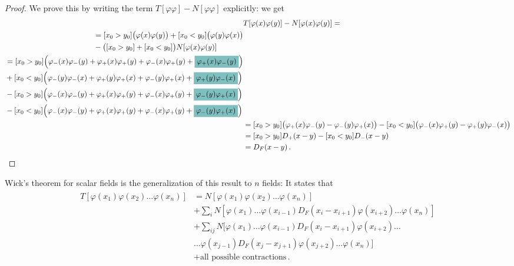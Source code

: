 \documentclass[main.tex]{subfiles}
\begin{document}
\begin{proof}
We prove this by writing the term \(T[\varphi \varphi ] - N[ \varphi \varphi ]\) explicitly: we get 
%
\begin{subequations}
\begin{align}
& T[\varphi (x)\varphi (y)] - N[\varphi (x) \varphi (y)] = \\
\begin{split}
&= [x_0 > y_0 ] \qty(\varphi (x) \varphi (y)) + [x_0 < y_0 ] \qty(\varphi (y) \varphi (x)) \\
& 
- \qty([x_0 > y_0 ] + [x_0 < y_0 ]) N [\varphi (x)\varphi (y)] 
\end{split}  \\
\begin{split}
&= 
[x_0 > y_0 ] \qty(\varphi_{-} (x) \varphi_{-} (y) + \varphi_{+} (x) \varphi_{+} (y) + \varphi_{-} (x) \varphi_{+} (y) + \hlc{teal}{\varphi_{+} (x) \varphi_{-} (y)}) \\
& 
+ 
[x_0 < y_0 ] \qty(\varphi_{-} (y) \varphi_{-} (x) + \varphi_{+} (y) \varphi_{+} (x) + \varphi_{-} (y) \varphi_{+} (x) + \hlc{teal}{\varphi_{+} (y) \varphi_{-} (x)}) 
\\
& 
-
[x_0 > y_0 ]
\qty(\varphi_{-} (x) \varphi_{-} (y) + \varphi_{+} (x) \varphi_{+} (y) + \varphi_{-} (x) \varphi_{+} (y) + \hlc{teal}{\varphi_{-} (y) \varphi_{+} (x)} ) 
\\
& 
-
[x_0 < y_0 ]
\qty(\varphi_{-} (x) \varphi_{-} (y) + \varphi_{+} (x) \varphi_{+} (y) + \varphi_{-} (x) \varphi_{+} (y) + \hlc{teal}{\varphi_{-} (y) \varphi_{+} (x)} ) 
\end{split}  \\
&= [x_0 > y_0 ] \qty(\varphi_{+} (x) \varphi_{-} (y) - \varphi_{-} (y) \varphi_{+} (x))
- [x_0 < y_0 ] \qty(\varphi_{-} (x) \varphi_{+} (y) - \varphi_{+}(y) \varphi_{-}(x))  \\
&= 
[x_0 > y_0 ]
D_+ (x-y)
-
[x_0 < y_0 ]
D_- (x-y) \\
&= D_F (x-y)
\,.
\end{align}
\end{subequations}
\end{proof}

Wick's theorem for scalar fields is the generalization of this result to \(n\) fields: 
It states that 
%
\begin{subequations}
\begin{align}
\begin{split}
T [\varphi (x_1 ) \varphi (x_2 ) \dots \varphi (x_n)]
&=
N [\varphi (x_1 ) \varphi (x_2 )\dots \varphi (x_n)] \\
&+ \sum_{i} N[\varphi (x_1 )\dots \varphi (x_{i-1}) D_F (x_i- x_{i+1}) \varphi (x_{i+2}) \dots \varphi (x_n)]  \\
&+ \sum _{ij}
N[\varphi (x_1 )\dots \varphi (x_{i-1}) D_F (x_i- x_{i+1}) \varphi (x_{i+2}) \dots \\
& \dots \varphi (x_{j-1}) D_F (x_j- x_{j+1}) \varphi (x_{j+2}) \dots \varphi (x_n)]  \\
&+ \text{all possible contractions}
\,.
\end{split}
\end{align}
\end{subequations}
\end{document}
